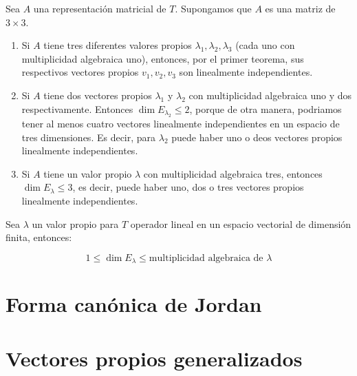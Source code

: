 		\begin{proposicion}
			Sea $A$ una representación matricial de $T$. Supongamos que $A$ es una matriz de $3 \times 3$.

			\begin{enumerate}
				\item Si $A$ tiene tres diferentes valores propios $\lambda_1, \lambda_2, \lambda_3$ (cada uno con multiplicidad algebraica uno), entonces, por el primer teorema, sus respectivos vectores propios $v_1, v_2, v_3$ son linealmente independientes.
				\item Si $A$ tiene dos vectores propios $\lambda_1$ y $\lambda_2$ con multiplicidad algebraica uno y dos respectivamente.
				Entonces $\dim{E_{\lambda_2}} \leq 2$, porque de otra manera, podriamos tener al menos cuatro vectores linealmente independientes en un espacio de tres dimensiones.
				Es decir, para $\lambda_2$ puede haber uno o deos vectores propios linealmente independientes.
				\item Si $A$ tiene un valor propio $\lambda$ con multiplicidad algebraica tres, entonces $\dim{E_{\lambda}} \leq 3$, es decir, puede haber uno, dos o tres vectores propios linealmente independientes.
			\end{enumerate}
		\end{proposicion}

		\begin{teorema}
			Sea $\lambda$ un valor propio para $T$ operador lineal en un espacio vectorial de dimensión finita, entonces:

			\begin{equation}
				1 \leq \dim{E_{\lambda}} \leq \text{multiplicidad algebraica de } \lambda
			\end{equation}
		\end{teorema}


\section{Forma canónica de Jordan}


\section{Vectores propios generalizados}